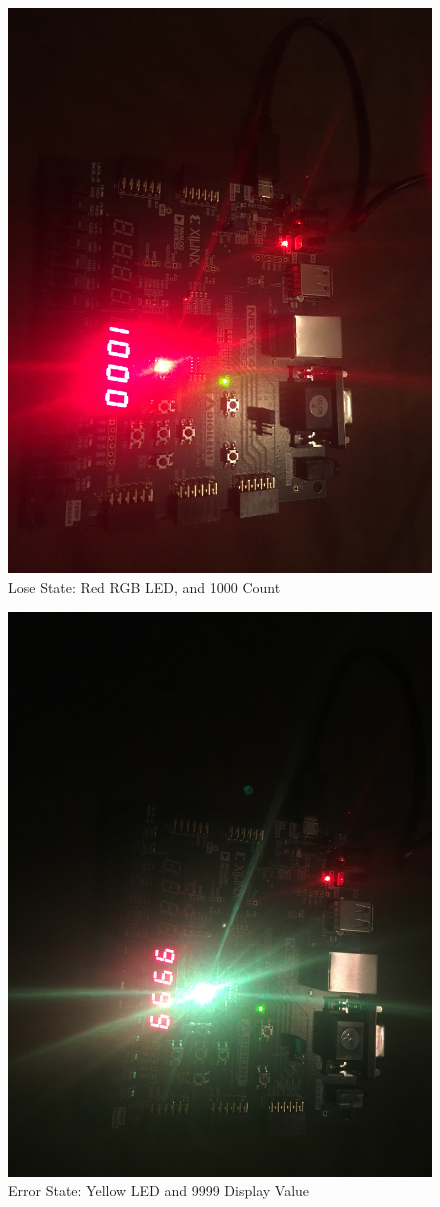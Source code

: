 \documentclass{article}
\begin{document}
\begin{center}
	\begin{figure}
		\includegraphics[width=.9\linewidth]{Lose.JPG}
		\caption{Lose State:  Red RGB LED, and 1000 Count}
		\label{fig:LoseImg}
	\end{figure}

	\begin{figure}
		\includegraphics[width=.9\linewidth]{Error.JPG}
		\caption{Error State: Yellow LED and 9999 Display Value}
		\label{fig:ReadyImg}
	\end{figure}
\end{center}
\end{document}
